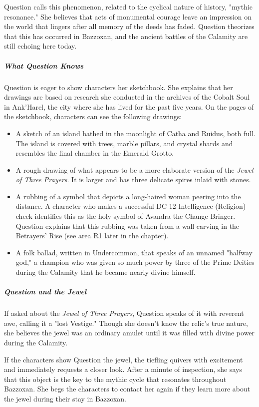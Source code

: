 \documentclass[10pt,a4paper,twoside,bg=print,twocolumn,openany,nodeprecatedcode]{dndbook}
\begin{document}
Question calls this phenomenon, related to the cyclical nature of history, "mythic resonance." She believes that acts of monumental courage leave an impression on the world that lingers after all memory of the deeds has faded. Question theorizes that this has occurred in Bazzoxan, and the ancient battles of the Calamity are still echoing here today.

\subparagraph{What Question Knows}
Question is eager to show characters her sketchbook. She explains that her drawings are based on research she conducted in the archives of the Cobalt Soul in Ank'Harel, the city where she has lived for the past five years. On the pages of the sketchbook, characters can see the following drawings:


\begin{itemize}
\item A sketch of an island bathed in the moonlight of Catha and Ruidus, both full. The island is covered with trees, marble pillars, and crystal shards and resembles the final chamber in the Emerald Grotto.
\item A rough drawing of what appears to be a more elaborate version of the \textit{Jewel of Three Prayers}. It is larger and has three delicate spires inlaid with stones.
\item A rubbing of a symbol that depicts a long-haired woman peering into the distance. A character who makes a successful DC 12 Intelligence (Religion) check identifies this as the holy symbol of Avandra the Change Bringer. Question explains that this rubbing was taken from a wall carving in the Betrayers' Rise (see area R1 later in the chapter).
\item A folk ballad, written in Undercommon, that speaks of an unnamed "halfway god," a champion who was given so much power by three of the Prime Deities during the Calamity that he became nearly divine himself.
\end{itemize}

\subparagraph{Question and the Jewel}
If asked about the \textit{Jewel of Three Prayers}, Question speaks of it with reverent awe, calling it a "lost Vestige." Though she doesn't know the relic's true nature, she believes the jewel was an ordinary amulet until it was filled with divine power during the Calamity.

If the characters show Question the jewel, the tiefling quivers with excitement and immediately requests a closer look. After a minute of inspection, she says that this object is the key to the mythic cycle that resonates throughout Bazzoxan. She begs the characters to contact her again if they learn more about the jewel during their stay in Bazzoxan.
\end{document}

